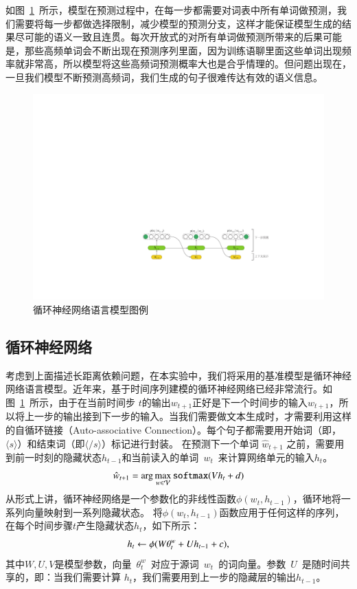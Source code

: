 如图~\ref{fig:lm}~所示，模型在预测过程中，在每一步都需要对词表中所有单词做预测，我们需要将每一步都做选择限制，减少模型的预测分支，这样才能保证模型生成的结果尽可能的语义一致且连贯。每次开放式的对所有单词做预测所带来的后果可能是，那些高频单词会不断出现在预测序列里面，因为训练语聊里面这些单词出现频率就非常高，所以模型将这些高频词预测概率大也是合乎情理的。但问题出现在，一旦我们模型不断预测高频词，我们生成的句子很难传达有效的语义信息。

\begin{figure}[!t]
  \centering
  \includegraphics[width=.99\columnwidth]{./figures/lm.pdf}
  \caption{循环神经网络语言模型图例}
  \label{fig:lm}
\end{figure}

\subsection{循环神经网络}
考虑到上面描述长距离依赖问题，在本实验中，我们将采用的基准模型是循环神经网络语言模型。近年来，基于时间序列建模的循环神经网络已经非常流行。如图~\ref{fig:lm}~所示，由于在当前时间步 $t$的输出$w_{t+1}$正好是下一个时间步的输入$w_{t+1}$，所以将上一步的输出接到下一步的输入。当我们需要做文本生成时，才需要利用这样的自循环链接（Auto-associative Connection）。每个句子都需要用开始词（即，$\langle s\rangle$）和结束词（即$\langle / s\rangle$）标记进行封装。 在预测下一个单词 $\hat w_{t+1}$ 之前，需要用到前一时刻的隐藏状态$h_{t-1}$和当前读入的单词~$w_t$~来计算网络单元的输入$h_t$。
\begin{equation}
\setlength{\abovedisplayskip}{6pt}
\setlength{\belowdisplayskip}{6pt}
  \hat w_{t+1}=\arg\max_{w\in\mathcal{V}} \mathtt{softmax}(Vh_t+d)
\end{equation}
从形式上讲，循环神经网络是一个参数化的非线性函数$\phi(w_t,h_{t-1})$，循环地将一系列向量映射到一系列隐藏状态。 将$\phi(w_t,h_{t-1})$函数应用于任何这样的序列，在每个时间步骤$t$产生隐藏状态$h_t$，如下所示：
\begin{equation}
\setlength{\abovedisplayskip}{6pt}
\setlength{\belowdisplayskip}{6pt}
  h_t \leftarrow  \phi(W\theta^w_t + U h_{t-1} +c),
\end{equation}
其中$ W,U,V $是模型参数，向量~$\theta^w_t$~对应于源词~$w_t$~的词向量。参数~$U$~是随时间共享的，即：当我们需要计算 $h_t$，我们需要用到上一步的隐藏层的输出$h_{t-1}$。

